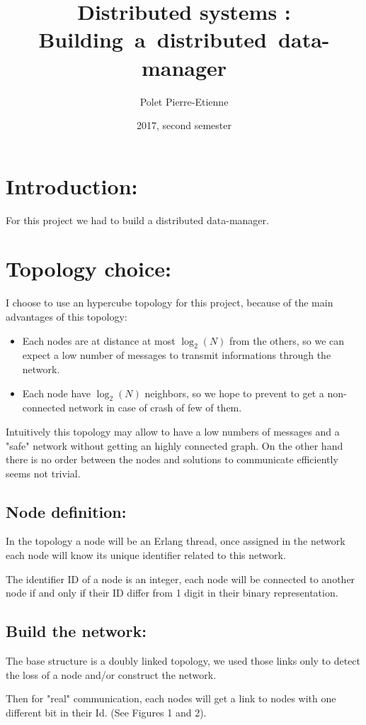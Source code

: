 \documentclass[10pt,a4paper]{article}
\title{Distributed systems : Building~a~distributed~data-manager}
\author{Polet Pierre-Etienne}
\date{2017, second semester}
\begin{document}
	\maketitle
	
	\section*{Introduction:}
		For this project we had to build a distributed data-manager.
		
	\section{Topology choice:}
		I choose to use an hypercube topology for this project, because of the main advantages of this topology:
		\begin{itemize}
			\item Each nodes are at distance at most $\log_2(N)$ from the others, so we can expect a low number of messages to transmit informations through the network.
			\item Each node have $\log_2(N)$ neighbors, so we hope to prevent to get a non-connected network in case of crash of few of them.
		\end{itemize}
		
		Intuitively this topology may allow to have a low numbers of messages and a "safe" network without getting an highly connected graph. On the other hand there is no order between the nodes and solutions to communicate efficiently seems not trivial.
		
		\subsection{Node definition:}
			In the topology a node will be an Erlang thread, once assigned in the network each node will know its unique identifier related to this network.
			
			The identifier ID of a node is an integer, each node will be connected to another node if and only if their ID differ from 1 digit in their binary representation.
			
		\subsection{Build the network:}
			The base structure is a doubly linked topology, we used those links only to detect the loss of a node and/or construct the network.
			
			Then for "real" communication, each nodes will get a link to nodes with one different bit in their Id. (See  Figures 1 and 2).
		
\end{document}
